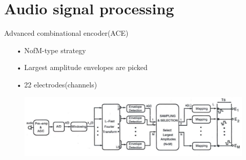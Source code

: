 \documentclass[notes=hide]{beamer}
\begin{document}
\section{Audio signal processing}
\begin{frame}


   \begin{block}{Advanced combinational encoder(ACE)}
   	\begin{itemize}
   		\item [•] NofM-type strategy
   		\item [•] Largest amplitude envelopes are picked
		\item [•] 22 electrodes(channels)
		
   	\end{itemize}
   \end{block}
   \begin{figure}
   	\includegraphics[scale=0.42]{Vortrag/BD_ACE.png}
   \end{figure}
\end{frame}


\newpage
\end{document}
